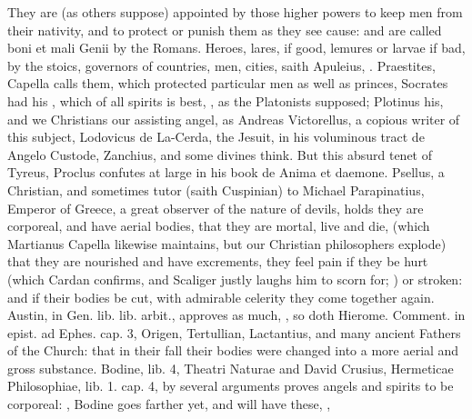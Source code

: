 {{They are (as others suppose) appointed by those higher powers to keep
men from their nativity, and to protect or punish them as they see
cause: and are called boni et mali Genii by the Romans. Heroes, lares,
if good, lemures or larvae if bad, by the stoics, governors of
countries, men, cities, saith Apuleius, . Praestites, Capella calls them,
which protected particular men as well as princes, Socrates had his
, which of all spirits is best, , as the Platonists supposed;
Plotinus his, and we Christians our assisting angel, as Andreas
Victorellus, a copious writer of this subject, Lodovicus de La-Cerda,
the Jesuit, in his voluminous tract de Angelo Custode, Zanchius, and
some divines think. But this absurd tenet of Tyreus, Proclus confutes
at large in his book \textlatin{de Anima et daemone}.
Psellus, a Christian, and sometimes tutor (saith Cuspinian) to
Michael Parapinatius, Emperor of Greece, a great observer of the nature
of devils, holds they are corporeal, and have aerial bodies,
that they are mortal, live and die, (which Martianus Capella likewise
maintains, but our Christian philosophers explode) that they are
nourished and have excrements, they feel pain if they be hurt (which
Cardan confirms, and Scaliger justly laughs him to scorn for;  \etc{}) or stroken: and
if their bodies be cut, with admirable celerity they come together
again. Austin, in Gen. lib.  lib. arbit., approves as much, , so doth
Hierome. Comment. in epist. ad Ephes. cap. 3, Origen, Tertullian,
Lactantius, and many ancient Fathers of the Church: that in their fall
their bodies were changed into a more aerial and gross substance.
Bodine, lib. 4, \textlatin{Theatri Naturae} and David Crusius, \textlatin{Hermeticae
Philosophiae}, lib. 1. cap. 4, by several arguments proves angels and
spirits to be corporeal: ,  Bodine
goes farther yet, and will have these, ,
}}
